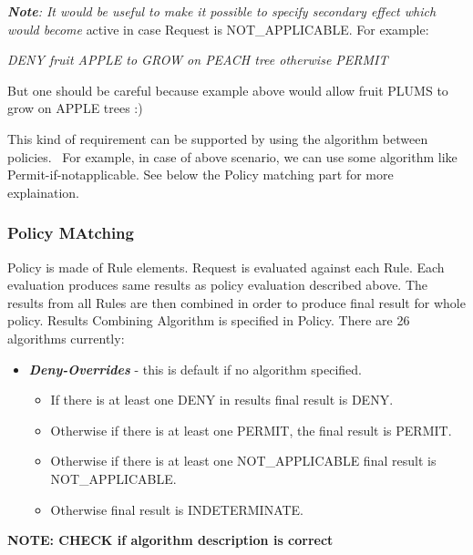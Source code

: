 \documentclass{article}
\newcommand\liststyleWWviiiNumxxi{%
\renewcommand\labelitemi{[F0B7?]}
\renewcommand\labelitemii{o}
\renewcommand\labelitemiii{[F0A7?]}
\renewcommand\labelitemiv{[F0B7?]}
}
\begin{document}
{\upshape\color{black}
\foreignlanguage{english}{\textbf{\textit{Note}}}\foreignlanguage{english}{\textit{:
It would be useful to make it possible to specify secondary effect
which would become }}\foreignlanguage{english}{active in case Request
is NOT\_APPLICABLE. For example:}}

{\itshape\color{black}
DENY fruit APPLE to GROW on PEACH tree otherwise PERMIT}

{\color{black}
But one should be careful because example above would allow fruit PLUMS
to grow on APPLE trees :)}

{\color{black}
This kind of requirement can be supported by using the algorithm between
policies. \ For example, in case of above scenario, we can use some
algorithm like {\textquotedbl}Permit-if-notapplicable{\textquotedbl}.
See below the {\textquotedbl}Policy matching{\textquotedbl} part for
more explaination. \ }

\subsubsection{Policy MAtching}
{\color{black}
Policy is made of Rule elements. Request is evaluated against each Rule.
Each evaluation produces same results as policy evaluation described
above. The results from all Rules are then combined in order to produce
final result for whole policy. Results Combining Algorithm is specified
in Policy. There are 26 algorithms currently:}

\liststyleWWviiiNumxxi
\begin{itemize}
\item {\color{black}
\foreignlanguage{english}{\textbf{\textit{Deny-Overrides}}}\foreignlanguage{english}{
- this is default if no algorithm specified.}}

\begin{itemize}
\item {\color{black}
If there is at least one DENY in results final result is DENY.}
\item {\color{black}
Otherwise if there is at least one PERMIT, the final result is PERMIT.}
\item {\color{black}
Otherwise if there is at least one NOT\_APPLICABLE final result is
NOT\_APPLICABLE.}
\item {\color{black}
Otherwise final result is INDETERMINATE.}
\end{itemize}
\end{itemize}
{\bfseries\color{black}
NOTE: CHECK if algorithm description is correct}
\end{document}
